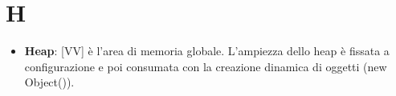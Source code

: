 %
%
%
%

\section{H} %
\label{sec:h}
	\begin{itemize}
		\item \textbf{Heap}: [VV] è l'area di memoria globale. L'ampiezza dello heap è fissata a configurazione e poi consumata con la creazione dinamica di oggetti (new Object()).
	\end{itemize}
